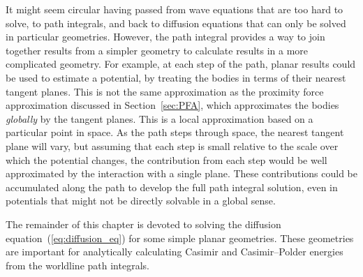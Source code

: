 It might seem circular having passed from wave equations that are too hard to solve, to path integrals,
and back to diffusion equations that can only be solved in particular geometries.
However, the path integral provides a way to join together results from a simpler geometry to calculate
results in a more complicated geometry.
For example, at each step of the path, planar results could be used to estimate a potential,
by treating the bodies in terms of their nearest tangent planes.  
This is not the same approximation as the proximity force approximation discussed in Section~\ref{sec:PFA}, 
which approximates the bodies \emph{globally} by the tangent planes. 
This is a local approximation based on a particular point in space.
As the path steps through space, the nearest tangent plane will vary, but assuming that each 
step is small relative to the scale over which the potential changes,
 the contribution from each step would be well approximated by the interaction with a single plane. 
These contributions could be accumulated along the path to develop the full path integral solution,
 even in potentials that might not be directly solvable in a global sense.  


The remainder of this chapter is devoted to solving the diffusion equation~(\ref{eq:diffusion_eq})
for some simple planar geometries.
These geometries are important for analytically calculating Casimir and Casimir--Polder
energies from the worldline path integrals.  
    
